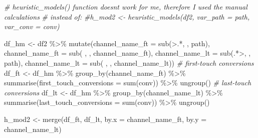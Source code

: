 \documentclass[
]{book}
\newenvironment{Shaded}{\begin{snugshade}}{\end{snugshade}}
\newcommand{\AttributeTok}[1]{\textcolor[rgb]{0.77,0.63,0.00}{#1}}
\newcommand{\CommentTok}[1]{\textcolor[rgb]{0.56,0.35,0.01}{\textit{#1}}}
\newcommand{\FunctionTok}[1]{\textcolor[rgb]{0.00,0.00,0.00}{#1}}
\newcommand{\NormalTok}[1]{#1}
\newcommand{\OtherTok}[1]{\textcolor[rgb]{0.56,0.35,0.01}{#1}}
\newcommand{\SpecialCharTok}[1]{\textcolor[rgb]{0.00,0.00,0.00}{#1}}
\newcommand{\StringTok}[1]{\textcolor[rgb]{0.31,0.60,0.02}{#1}}
\begin{document}
\begin{Shaded}
\begin{Highlighting}[]
\CommentTok{\# heuristic\_models() function doesn\textquotesingle{}t work for me, therefore I used the manual calculations}
\CommentTok{\# instead of:}
\CommentTok{\#h\_mod2 \textless{}{-} heuristic\_models(df2, var\_path = \textquotesingle{}path\textquotesingle{}, var\_conv = \textquotesingle{}conv\textquotesingle{})}
 
\NormalTok{df\_hm }\OtherTok{\textless{}{-}}\NormalTok{ df2 }\SpecialCharTok{\%\textgreater{}\%}
        \FunctionTok{mutate}\NormalTok{(}\AttributeTok{channel\_name\_ft =} \FunctionTok{sub}\NormalTok{(}\StringTok{\textquotesingle{}\textgreater{}.*\textquotesingle{}}\NormalTok{, }\StringTok{\textquotesingle{}\textquotesingle{}}\NormalTok{, path),}
               \AttributeTok{channel\_name\_ft =} \FunctionTok{sub}\NormalTok{(}\StringTok{\textquotesingle{} \textquotesingle{}}\NormalTok{, }\StringTok{\textquotesingle{}\textquotesingle{}}\NormalTok{, channel\_name\_ft),}
               \AttributeTok{channel\_name\_lt =} \FunctionTok{sub}\NormalTok{(}\StringTok{\textquotesingle{}.*\textgreater{}\textquotesingle{}}\NormalTok{, }\StringTok{\textquotesingle{}\textquotesingle{}}\NormalTok{, path),}
               \AttributeTok{channel\_name\_lt =} \FunctionTok{sub}\NormalTok{(}\StringTok{\textquotesingle{} \textquotesingle{}}\NormalTok{, }\StringTok{\textquotesingle{}\textquotesingle{}}\NormalTok{, channel\_name\_lt))}
\CommentTok{\# first{-}touch conversions}
\NormalTok{df\_ft }\OtherTok{\textless{}{-}}\NormalTok{ df\_hm }\SpecialCharTok{\%\textgreater{}\%}
        \FunctionTok{group\_by}\NormalTok{(channel\_name\_ft) }\SpecialCharTok{\%\textgreater{}\%}
        \FunctionTok{summarise}\NormalTok{(}\AttributeTok{first\_touch\_conversions =} \FunctionTok{sum}\NormalTok{(conv)) }\SpecialCharTok{\%\textgreater{}\%}
        \FunctionTok{ungroup}\NormalTok{()}
\CommentTok{\# last{-}touch conversions}
\NormalTok{df\_lt }\OtherTok{\textless{}{-}}\NormalTok{ df\_hm }\SpecialCharTok{\%\textgreater{}\%}
        \FunctionTok{group\_by}\NormalTok{(channel\_name\_lt) }\SpecialCharTok{\%\textgreater{}\%}
        \FunctionTok{summarise}\NormalTok{(}\AttributeTok{last\_touch\_conversions =} \FunctionTok{sum}\NormalTok{(conv)) }\SpecialCharTok{\%\textgreater{}\%}
        \FunctionTok{ungroup}\NormalTok{()}
 
\NormalTok{h\_mod2 }\OtherTok{\textless{}{-}} \FunctionTok{merge}\NormalTok{(df\_ft, df\_lt, }\AttributeTok{by.x =} \StringTok{\textquotesingle{}channel\_name\_ft\textquotesingle{}}\NormalTok{, }\AttributeTok{by.y =} \StringTok{\textquotesingle{}channel\_name\_lt\textquotesingle{}}\NormalTok{)}
 

\end{Highlighting}
\end{Shaded}
\end{document}
